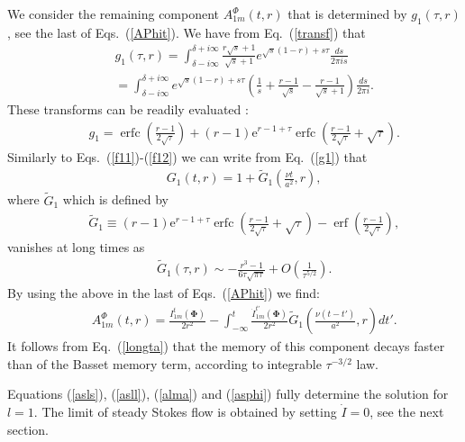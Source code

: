 \documentclass[aps,prx,twocolumn,amsmath,amssymb,amsfonts]{revtex4-2}
\newcommand{\re}{\mathrm{e}}            %
\DeclareMathOperator\erfc{erfc}
\DeclareMathOperator\erf{erf}
\begin{document}
We consider the remaining component $A_{1m}^{\Phi}(t, r)$ that is determined by $g_1(\tau, r)$, see the last of Eqs.~(\ref{APhit}). We have from Eq.~(\ref{transf}) that
\begin{eqnarray}&&
g_1(\tau, r)=\int_{\delta-i\infty}^{\delta+i\infty}\frac{r \sqrt{s}+1}{\sqrt{s}+1}e^{\sqrt{s}(1-r)+s\tau}\frac{ds}{2\pi i s}\\&&
=\int_{\delta-i\infty}^{\delta+i\infty}e^{\sqrt{s}(1-r)+s\tau}\left(\frac{1}{s}+\frac{r-1}{\sqrt{s}}-\frac{r-1}{\sqrt{s}+1}\right)\frac{ds}{2\pi i}.\nonumber
\end{eqnarray}
These transforms can be readily evaluated \cite{prud}:
\begin{eqnarray}&&\!\!\!\!\!\!\!\!
g_1\!=\!\erfc\left(\frac{r\!-\!1}{2\sqrt{\tau}}\right)\!+\!(r\!-\!1)\re^{r-1+\tau}\erfc\left(\frac{r\!-\!1}{2\sqrt{\tau}}\!+\!\sqrt{\tau}\right).\label{g1}
\end{eqnarray}
Similarly to Eqs.~(\ref{f11})-(\ref{f12}) we can write from Eq.~(\ref{g1}) that
\begin{eqnarray}&&\!\!\!\!\!\!\!
G_1(t, r)=1+{\tilde G}_1\left(\frac{\nu t}{a^2}, r\right), \label{f111}
\end{eqnarray}
where ${\tilde G}_1$ which is defined by
\begin{eqnarray}&&\!\!\!\!\!\!\!\!\!\!
{\tilde G}_1\!\equiv\! (r\!-\!1)\re^{r-1+\tau}\erfc\left(\frac{r\!-\!1}{2\sqrt{\tau}}\!+\!\sqrt{\tau}\right)\!-\!\erf\left(\frac{r\!-\!1}{2\sqrt{\tau}}\right),
\end{eqnarray}
vanishes at long times as
\begin{eqnarray}&&\!\!\!\!\!\!\!
{\tilde G}_1\left(\tau, r\right)\sim -\frac{r^3-1}{6\tau\sqrt{\pi\tau}}+O\left(\frac{1}{\tau^{5/2}}\right).\label{longta}
\end{eqnarray}
By using the above in the last of Eqs.~(\ref{APhit}) we find:
\begin{eqnarray}&&\!\!\!\!\!\!\!\!\!\!\!\!
A_{1m}^{\Phi}(t, r)\! =\!\frac{I_{1m}^{t}(\bm \Phi)}{2r^2}
\!-\!\!\int_{-\infty}^{t}\! \!\!\!\frac{\dot{I}_{1m}^{t'}(\bm \Phi)}{2r^2}{\tilde G}_1\!\left(\!\frac{\nu (t\!-\!t')}{a^2}, r\!\right)\!dt'.  \label{asphi}
\end{eqnarray}
It follows from Eq.~(\ref{longta}) that the memory of this component decays faster than of the Basset memory term, according to integrable $\tau^{-3/2}$ law.

Equations (\ref{asls}), (\ref{asll}),  (\ref{alma}) and (\ref{asphi}) fully determine the solution for $l=1$. The limit of steady Stokes flow is obtained by setting $\dot I=0$, see the next section.
\end{document}
